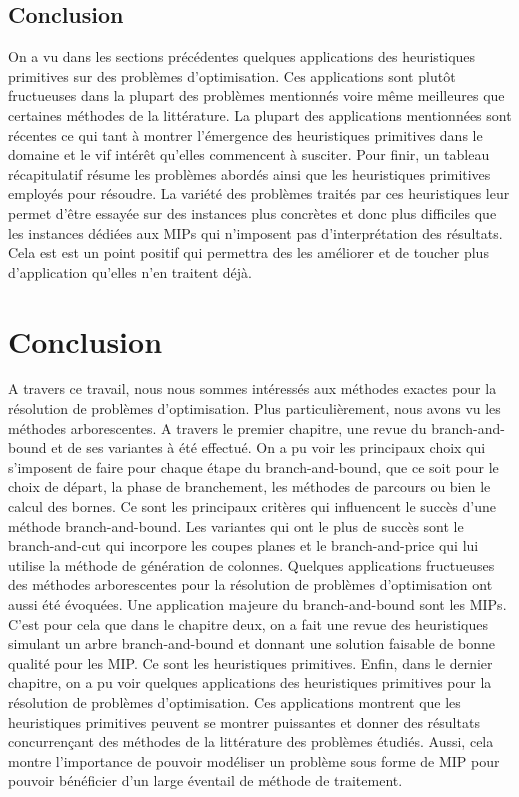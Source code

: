 \documentclass[12pt,a4paper,oneside]{book}
\theoremstyle{definition}
\begin{document}
	\section{Conclusion}
	On a vu dans les sections précédentes quelques applications des heuristiques primitives sur des problèmes d'optimisation. Ces applications sont plutôt fructueuses dans la plupart des problèmes mentionnés voire même meilleures que certaines méthodes de la littérature. La plupart des applications mentionnées sont récentes ce qui tant à montrer l'émergence des heuristiques primitives dans le domaine et le vif intérêt qu'elles commencent à susciter. Pour finir, un tableau récapitulatif résume les problèmes abordés ainsi que les heuristiques primitives employés pour résoudre. 
	La variété des problèmes traités par ces heuristiques leur permet d'être essayée sur des instances plus concrètes et donc plus difficiles que les instances dédiées aux MIPs qui n'imposent pas d'interprétation des résultats. Cela est est un point positif qui permettra des les améliorer et de toucher plus d'application qu'elles n'en traitent déjà.
	
	
	\chapter*{Conclusion}
	A travers ce travail, nous nous sommes intéressés aux méthodes exactes pour la résolution de problèmes d'optimisation. Plus particulièrement, nous avons vu les méthodes arborescentes. A travers le premier chapitre, une revue du branch-and-bound et de ses variantes à été effectué. On a pu voir les principaux choix qui s'imposent de faire pour chaque étape du branch-and-bound, que ce soit pour le choix de départ, la phase de branchement, les méthodes de parcours ou bien le calcul des bornes. Ce sont les principaux critères qui influencent le succès d'une méthode branch-and-bound. Les variantes qui ont le plus de succès sont le branch-and-cut qui incorpore les coupes planes et le branch-and-price qui lui utilise la méthode de génération de colonnes. Quelques applications fructueuses des méthodes arborescentes pour la résolution de problèmes d'optimisation ont aussi été évoquées. Une application majeure du branch-and-bound sont les MIPs. C'est pour cela que dans le chapitre deux, on a fait une revue des heuristiques simulant un arbre branch-and-bound et donnant une solution faisable de bonne qualité pour les MIP. Ce sont les heuristiques primitives. Enfin, dans le dernier chapitre, on a pu voir quelques applications des heuristiques primitives pour la résolution de problèmes d'optimisation. Ces applications montrent que les heuristiques primitives peuvent se montrer puissantes et donner des résultats concurrençant des méthodes de la littérature des problèmes étudiés. Aussi, cela montre l'importance de pouvoir modéliser un problème sous forme de MIP pour pouvoir bénéficier d'un large éventail de méthode de traitement. 
	
\end{document}
